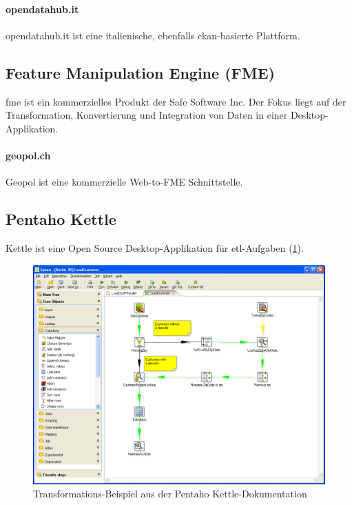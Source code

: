 \paragraph{opendatahub.it}
opendatahub.it ist eine italienische, ebenfalls \gls{ckan}-basierte Plattform.

\subsection{Feature Manipulation Engine (FME)}
\gls{fme} ist ein kommerzielles Produkt der Safe Software Inc. Der Fokus liegt auf der Transformation, Konvertierung und Integration von Daten in einer Desktop-Applikation.

\paragraph{geopol.ch}
Geopol ist eine kommerzielle Web-to-FME Schnittstelle.

\subsection{Pentaho Kettle}
Kettle ist eine Open Source Desktop-Applikation für \acs{etl}-Aufgaben (\cref{fig:tb:kettle}).

\begin{figure}[H]
    \centering
    \includegraphics[width=2\linewidth/3]{fig/kettle-spoon-transformation}
    \caption{Transformations-Beispiel aus der Pentaho Kettle-Dokumentation}
    \label{fig:tb:kettle}
\end{figure}

